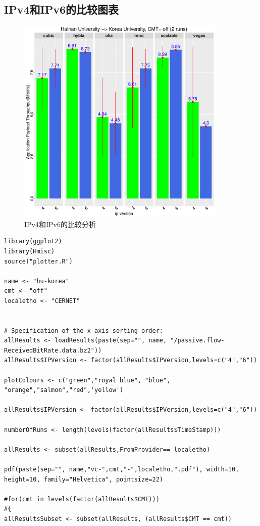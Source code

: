 \documentclass[a4paper,12pt]{ctexbook}
\begin{document}
\begin{flushleft}
\newpage
\section{IPv4和IPv6的比较图表}
\begin{figure}[H]
	\begin{center}
		\includegraphics[width=10cm]{NorNet示例/vc-hu-korea/hu-koreavc-mptcp-CERNET.pdf}
		\caption{IPv4和IPv6的比较分析}
	\end{center}
\end{figure}
\begin{verbatim}
library(ggplot2)
library(Hmisc)
source("plotter.R")

name <- "hu-korea"
cmt <- "off"
localetho <- "CERNET"


# Specification of the x-axis sorting order:
allResults <- loadResults(paste(sep="", name, "/passive.flow-ReceivedBitRate.data.bz2"))
allResults$IPVersion <- factor(allResults$IPVersion,levels=c("4","6"))

plotColours <- c("green","royal blue", "blue", "orange","salmon","red",'yellow')

allResults$IPVersion <- factor(allResults$IPVersion,levels=c("4","6"))

numberOfRuns <- length(levels(factor(allResults$TimeStamp)))

allResults <- subset(allResults,FromProvider== localetho)

pdf(paste(sep="", name,"vc-",cmt,"-",localetho,".pdf"), width=10, height=10, family="Helvetica", pointsize=22)

#for(cmt in levels(factor(allResults$CMT))) 
#{
allResultsSubset <- subset(allResults, (allResults$CMT == cmt))


\end{verbatim}
\end{flushleft}
\end{document}
